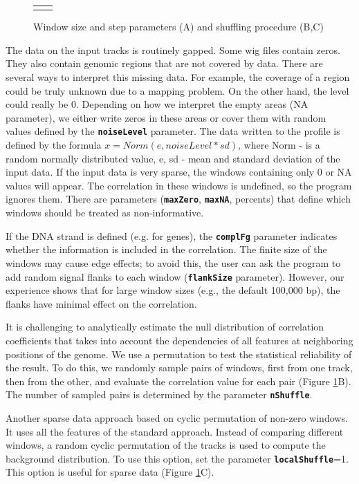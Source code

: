 \documentclass{article}
\newcommand{\tw}{\textwidth}
\newcommand{\prm}[1]{\texttt{\textbf{{#1}}}}
\begin{document}
\begin{figure}
\begin{tabular}{cc}
\begin{minipage}{0.45\tw}
\begin{center}
\end{center}
\end{minipage}
\end{tabular}
\caption{Window size and step parameters (A) and shuffling procedure (B,C)}\label{sh}
\end{figure} 

The data on the input tracks is routinely gapped. Some wig files contain zeros. They also contain genomic regions that are not covered by data. There are several ways to interpret this missing data. For example, the coverage of a region could be truly unknown due to a mapping problem. On the other hand, the level could really be 0. Depending on how we interpret the empty areas (NA parameter), we either write zeros in these areas or cover them with random values defined by the \prm{noiseLevel} parameter. The data written to the profile is defined by the formula $x=Norm(e, noiseLevel*sd)$, where Norm - is a random normally distributed value, e, sd - mean and standard deviation of the input data. If the input data is very sparse, the windows containing only 0 or NA values will appear. The correlation in these windows is undefined, so the program ignores them. There are parameters (\prm{maxZero}, \prm{maxNA}, percents) that define which windows should be treated as non-informative.

If the DNA strand is defined (e.g. for genes), the \prm{complFg} parameter indicates whether the information is included in the correlation. The finite size of the windows may cause edge effects; to avoid this, the user can ask the program to add random signal flanks to each window (\prm{flankSize} parameter). However, our experience shows that for large window sizes (e.g., the default 100,000 bp), the flanks have minimal effect on the correlation. 

It is challenging to analytically estimate the null distribution of correlation coefficients that takes into account the dependencies of all features at neighboring positions of the genome. We use a permutation to test the statistical reliability of the result. To do this, we randomly sample pairs of windows, first from one track, then from the other, and evaluate the correlation value for each pair (Figure \ref{sh}B).  The number of sampled pairs is determined by the parameter \prm{nShuffle}. 

Another sparse data approach based on cyclic permutation of non-zero windows. It uses all the features of the standard approach. Instead of comparing different windows, a random cyclic permutation of the tracks is used to compute the background distribution. To use this option, set the parameter \prm{localShuffle}=1. This option is useful for sparse data (Figure \ref{sh}C).
\end{document}
